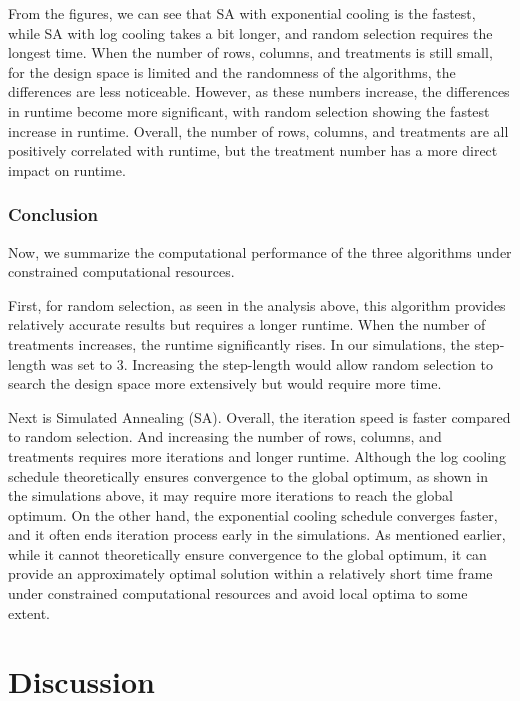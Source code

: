 \documentclass[
  a4paper,
  oneside,
  openany,
  12pt,
  onecolumn]{book}
\theoremstyle{definition}
\theoremstyle{plain}
\theoremstyle{remark}
\begin{document}
From the figures, we can see that SA with exponential cooling is the
fastest, while SA with log cooling takes a bit longer, and random
selection requires the longest time. When the number of rows, columns,
and treatments is still small, for the design space is limited and the
randomness of the algorithms, the differences are less noticeable.
However, as these numbers increase, the differences in runtime become
more significant, with random selection showing the fastest increase in
runtime. Overall, the number of rows, columns, and treatments are all
positively correlated with runtime, but the treatment number has a more
direct impact on runtime.

\subsection{Conclusion}\label{conclusion}

Now, we summarize the computational performance of the three algorithms
under constrained computational resources.

First, for random selection, as seen in the analysis above, this
algorithm provides relatively accurate results but requires a longer
runtime. When the number of treatments increases, the runtime
significantly rises. In our simulations, the step-length was set to 3.
Increasing the step-length would allow random selection to search the
design space more extensively but would require more time.

Next is Simulated Annealing (SA). Overall, the iteration speed is faster
compared to random selection. And increasing the number of rows,
columns, and treatments requires more iterations and longer runtime.
Although the log cooling schedule theoretically ensures convergence to
the global optimum, as shown in the simulations above, it may require
more iterations to reach the global optimum. On the other hand, the
exponential cooling schedule converges faster, and it often ends
iteration process early in the simulations. As mentioned earlier, while
it cannot theoretically ensure convergence to the global optimum, it can
provide an approximately optimal solution within a relatively short time
frame under constrained computational resources and avoid local optima
to some extent.


\chapter{Discussion}\label{sec-discuss}
\end{document}
